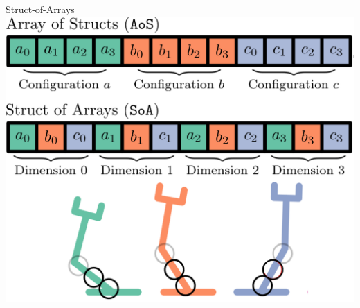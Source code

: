 \documentclass{beamer}
\begin{document}
\begin{frame}{Struct-of-Arrays}
\centering
\includegraphics[height=0.8\textheight]{./assets/soa_aos_bar.png}
\end{frame}
\end{document}
